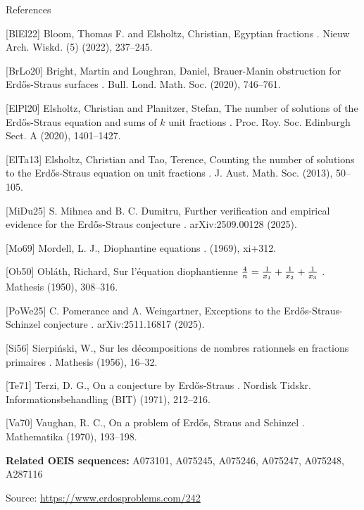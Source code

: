 \documentclass{article}
\begin{document}
References

[BlEl22] Bloom, Thomas F. and Elsholtz, Christian, Egyptian fractions . Nieuw Arch. Wiskd. (5) (2022), 237--245.

[BrLo20] Bright, Martin and Loughran, Daniel, Brauer-{M}anin obstruction for {E}rd\H os-Straus surfaces . Bull. Lond. Math. Soc. (2020), 746--761.

[ElPl20] Elsholtz, Christian and Planitzer, Stefan, The number of solutions of the {E}rd\H os-Straus equation and sums of {$k$} unit fractions . Proc. Roy. Soc. Edinburgh Sect. A (2020), 1401--1427.

[ElTa13] Elsholtz, Christian and Tao, Terence, Counting the number of solutions to the {E}rd\H os-Straus equation on unit fractions . J. Aust. Math. Soc. (2013), 50--105.

[MiDu25] S. Mihnea and B. C. Dumitru, Further verification and empirical evidence for the Erd\H{o}s-Straus conjecture . arXiv:2509.00128 (2025).

[Mo69] Mordell, L. J., Diophantine equations . (1969), xi+312.

[Ob50] Obl\'{a}th, Richard, Sur l'\'equation diophantienne {$\frac 4n=\frac1{x_1}+\frac 1{x\sb 2}+\frac 1{x_3}$} . Mathesis (1950), 308--316.

[PoWe25] C. Pomerance and A. Weingartner, Exceptions to the Erd\H{o}s-Straus-Schinzel conjecture . arXiv:2511.16817 (2025).

[Si56] Sierpi\'nski, W., Sur les d\'ecompositions de nombres rationnels en fractions primaires . Mathesis (1956), 16--32.

[Te71] Terzi, D. G., On a conjecture by {E}rd\H os-Straus . Nordisk Tidskr. Informationsbehandling (BIT) (1971), 212--216.

[Va70] Vaughan, R. C., On a problem of {E}rd\H os, Straus and Schinzel . Mathematika (1970), 193--198.

\noindent\textbf{Related OEIS sequences:} A073101, A075245, A075246, A075247, A075248, A287116

\bigskip
\noindent\small{Source: \url{https://www.erdosproblems.com/242}}
\end{document}
